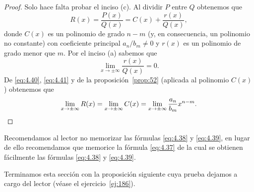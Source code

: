 \documentclass[12pt,a4paper]{book}
\begin{document}
    \begin{proof}
        Solo hace falta probar el inciso (c). Al dividir $P$ entre $Q$ obtenemos
        que
        \begin{equation}\label{eq:4.40}
            R(x)=\frac{P(x)}{Q(x)}=C(x)+\frac{r(x)}{Q(x)},
        \end{equation}
        donde $C(x)$ es un polinomio de grado $n-m$ (y, en consecuencia, un polinomio
        no constante) con coeficiente principal $a_{n}/b_{m}\neq 0$ y $r(x)$ es un polinomio de
        grado menor que $m$. Por el inciso (a) sabemos que
        \begin{equation}\label{eq:4.41}
            \lim_{x\to\pm\infty}\frac{r(x)}{Q(x)}=0.
        \end{equation}
        De \eqref{eq:4.40}, \eqref{eq:4.41} y de la proposición~\ref{prop:52} (aplicada al polinomio $C(x)$) obtenemos
        que
        \begin{equation*}
            \lim_{x\to\pm\infty}R(x)=\lim_{x\to\pm\infty}C(x)=\lim_{x\to\pm\infty}\frac{a_{n}}{b_{m}}x^{n-m}.\qedhere
        \end{equation*}
    \end{proof}

    Recomendamos al lector no memorizar las fórmulas \eqref{eq:4.38} y \eqref{eq:4.39}, en
    lugar de ello recomendamos que memorice la fórmula \eqref{eq:4.37} de la cual se
    obtienen fácilmente las fórmulas \eqref{eq:4.38} y \eqref{eq:4.39}.

    Terminamos esta sección con la proposición siguiente cuya prueba dejamos
    a cargo del lector (véase el ejercicio~\ref{ej:186}).
\end{document}
